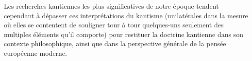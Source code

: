 Les recherches kantiennes les plus
significatives de notre époque tendent
cependant à dépasser ces interprétations
du kantisme (unilatérales dans la mesure
où elles se contentent de souligner tour à
tour quelques-uns seulement des multiples
éléments qu’il comporte) pour restituer
la doctrine kantienne dans son
contexte philosophique, ainsi que dans la
perspective générale de la pensée européenne
moderne.

